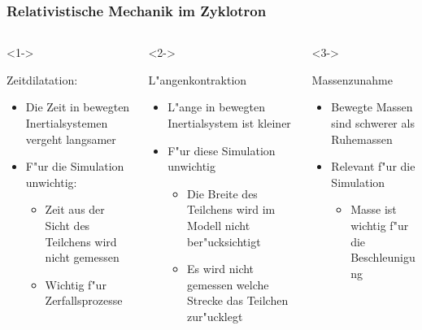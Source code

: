 \documentclass{beamer}
\begin{document}
\begin{frame}
\frametitle{Relativistische Mechanik im Zyklotron}
  \begin{columns}
    \begin{column}{0.33\textwidth}<1->
      \begin{block}{Zeitdilatation:}
        \begin{itemize}
          \item Die Zeit in bewegten Inertialsystemen vergeht langsamer
          \item F"ur die Simulation unwichtig:
          \begin{itemize}
            \item Zeit aus der Sicht des Teilchens wird nicht gemessen
            \item Wichtig f"ur Zerfallsprozesse
          \end{itemize}
        \end{itemize}
      \end{block}
    \end{column}
    \begin{column}{0.33\textwidth}<2->
      \begin{block}{L"angenkontraktion}
        \begin{itemize}
          \item L"ange in bewegten Inertialsystem ist kleiner
          \item F"ur diese Simulation unwichtig
          \begin{itemize}
            \item Die Breite des Teilchens wird im Modell nicht ber"ucksichtigt
            \item Es wird nicht gemessen welche Strecke das Teilchen zur"ucklegt
          \end{itemize}
        \end{itemize}
      \end{block}
    \end{column}
    \begin{column}{0.33\textwidth}<3->
      \begin{block}{Massenzunahme}
        \begin{itemize}
          \item Bewegte Massen sind schwerer als Ruhemassen
          \item Relevant f"ur die Simulation
          \begin{itemize}
            \item Masse ist wichtig f"ur die Beschleunigung

\end{itemize}
\end{itemize}
\end{block}
\end{column}
\end{columns}
\end{frame}
\end{document}
